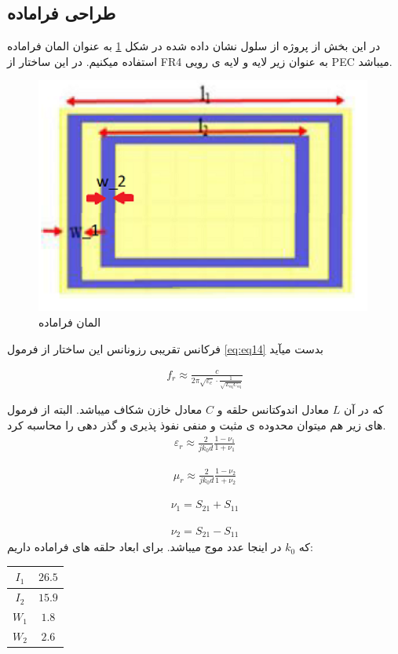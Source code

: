 \subsection{طراحی فراماده}
در این بخش از پروژه از سلول نشان داده شده در شکل
\ref{fig37}
 به عنوان المان فراماده استفاده میکنیم. در این ساختار از FR4 به عنوان زیر لایه و لایه ی رویی PEC میباشد.
\begin{figure}
	\centering
	\includegraphics[scale=0.5]{Images/fig37.png}
	\caption{المان فراماده}
	\label{fig37}
\end{figure}

فرکانس تقریبی رزونانس این ساختار از فرمول 
\eqref{eq:eq14}
 بدست میآید

\begin{align}
	\label{eq:eq14}
	f_r \approx \frac{c}{2\pi\sqrt{\varepsilon_{e}} \cdot \frac{1}{\sqrt{L_{\text{eq}}C_{\text{eq}}}}}
\end{align}

که در آن
$L$
 معادل اندوکتانس حلقه و
 $ C $
 معادل خازن شکاف میباشد. البته از فرمول های زیر هم میتوان محدوده ی مثبت و منفی نفوذ پذیری و گذر دهی را محاسبه کرد.
\begin{align}
	\label{eq:eq15}
	\varepsilon_r \approx \frac{2}{jk_0d}\frac{1-\nu_1}{1+\nu_1}
\end{align}

\begin{align}
	\label{eq:eq15}
	\mu_r \approx \frac{2}{jk_0d}\frac{1-\nu_2}{1+\nu_2}
\end{align}

\begin{align}
	\label{eq:eq15}
	\nu_1=S_{21}+S_{11}
\end{align}


\begin{align}
	\label{eq:eq15}
	\nu_2=S_{21}-S_{11}
\end{align}
که
$ k_0$
 در اینجا عدد موج میباشد.
برای ابعاد حلقه های فراماده داریم:
 \begin{center}
	\begin{tabular}{|c|c|}
		\hline
		$I_1$ & $26.5$ \\
		\hline
		$I_2$ & $15.9$ \\
		\hline
		$W_1$ & $1.8$ \\
		\hline
		$W_2$ & $2.6$ \\
		\hline
	\end{tabular}
\end{center}

